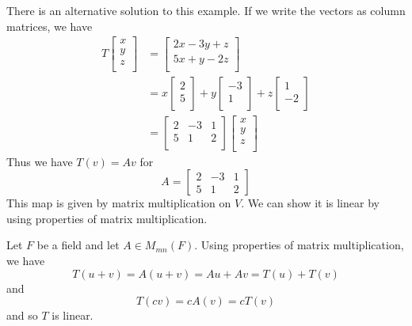 \documentclass{article}
\begin{document}
\begin{example}
  There is an alternative solution to this example. If we write the vectors as column matrices, we have
  \begin{align*}
    T
    \begin{bmatrix}
      x\\y\\z\\
    \end{bmatrix} &=
    \begin{bmatrix}
      2x - 3y + z\\5x+y-2z\\
    \end{bmatrix}\\
    &= x
    \begin{bmatrix}
      2\\5\\
    \end{bmatrix} + y
    \begin{bmatrix}
      -3\\1\\
    \end{bmatrix} + z
    \begin{bmatrix}
      1\\-2\\
    \end{bmatrix}\\
    &=
    \begin{bmatrix}
      2 & -3 & 1\\
      5 & 1 & 2\\
    \end{bmatrix}
    \begin{bmatrix}
      x\\y\\z\\
    \end{bmatrix}
  \end{align*}
  Thus we have $T(v) = Av$ for \[
    A =
    \begin{bmatrix}2 & -3 & 1\\
      5 & 1 & 2
    \end{bmatrix}
  \]
  This map is given by matrix multiplication on $V$. We can show it is linear by using properties of matrix multiplication.
\end{example}
\begin{theorem}
  Let $F$ be a field and let $A \in M_{mn}(F)$. Using properties of matrix multiplication, we have \[
    T(u+v) = A(u+v) = Au + Av = T(u) + T(v)
  \] and \[
    T(cv) = cA(v) = cT(v)
  \]
  and so $T$ is linear.
\end{theorem}
\end{document}
